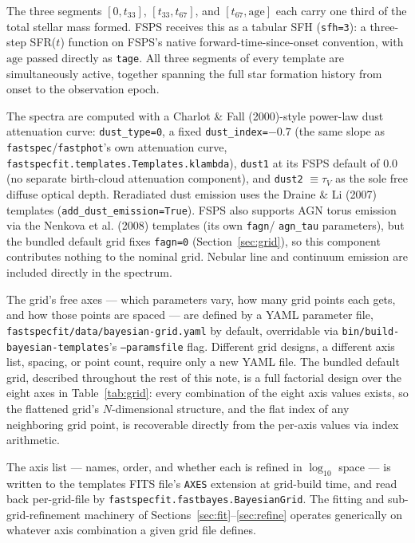\documentclass[12pt]{article}
\begin{document}
The three segments $[0,t_{33}]$, $[t_{33},t_{67}]$, and
$[t_{67},\mathrm{age}]$ each carry one third of the total stellar mass
formed. FSPS receives this as a tabular SFH (\texttt{sfh=3}): a three-step
SFR($t$) function on FSPS's native forward-time-since-onset convention,
with $\mathrm{age}$ passed directly as \texttt{tage}. All three segments
of every template are simultaneously active, together spanning the full
star formation history from onset to the observation epoch.

The spectra are computed with a Charlot \& Fall (2000)-style power-law
dust attenuation curve: \texttt{dust\_type=0}, a fixed
\texttt{dust\_index=$-0.7$} (the same slope as
\texttt{fastspec}/\texttt{fastphot}'s own attenuation curve,
\texttt{fastspecfit.templates.Templates.klambda}), \texttt{dust1} at its
FSPS default of 0.0 (no separate birth-cloud attenuation component), and
\texttt{dust2} $\equiv\tau_V$ as the sole free diffuse optical depth.
Reradiated dust emission uses the Draine \& Li (2007) templates
(\texttt{add\_dust\_emission=True}). FSPS also supports AGN torus emission
via the Nenkova et al. (2008) templates (its own \texttt{fagn}/
\texttt{agn\_tau} parameters), but the bundled default grid fixes
\texttt{fagn=0} (Section~\ref{sec:grid}), so this component contributes
nothing to the nominal grid. Nebular line and continuum emission are
included directly in the spectrum.

The grid's free axes --- which parameters vary, how many grid points each
gets, and how those points are spaced --- are defined by a YAML parameter
file, \texttt{fastspecfit/data/bayesian-grid.yaml} by default,
overridable via \texttt{bin/build-bayesian-templates}'s
\texttt{--paramsfile} flag. Different grid designs, a different axis
list, spacing, or point count, require only a new YAML file. The bundled
default grid, described throughout the rest of this note, is a full
factorial design over the eight axes in Table~\ref{tab:grid}: every
combination of the eight axis values exists, so the flattened grid's
$N$-dimensional structure, and the flat index of any neighboring grid
point, is recoverable directly from the per-axis values via index
arithmetic.

The axis list --- names, order, and whether each is refined in
$\log_{10}$ space --- is written to the templates FITS file's
\texttt{AXES} extension at grid-build time, and read back per-grid-file
by \texttt{fastspecfit.fastbayes.BayesianGrid}. The fitting and
sub-grid-refinement machinery of Sections~\ref{sec:fit}--\ref{sec:refine}
operates generically on whatever axis combination a given grid file
defines.
\end{document}
